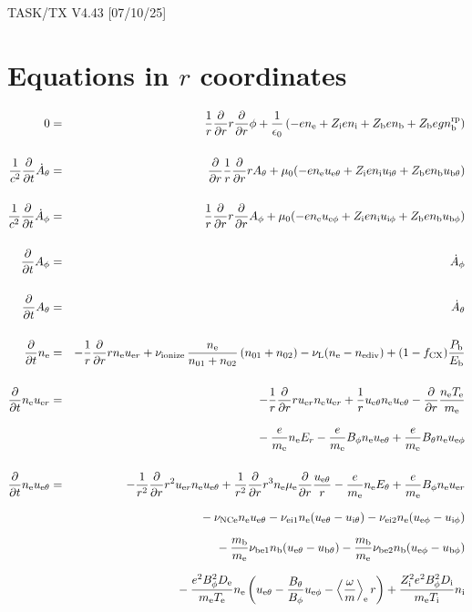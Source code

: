 \documentclass[11pt]{article}
\def\r#1{{\rm#1}}
\def\ddt{\frac{\partial}{\partial t}}
\def\ddr{\frac{\partial}{\partial r}}
\def\ave#1{\left\langle#1\right\rangle}
\def\me{m_\r{e}}
\def\mb{m_\r{b}}
\def\mue{\mu_\r{e}}
\def\De{D_\r{e}}
\def\Di{D_\r{i}}
\def\ne{n_\r{e}}
\def\ni{n_\r{i}}
\def\nb{n_\r{b}}
\def\uer{u_{\r{e}r}}
\def\ueth{u_{\r{e}\theta}}
\def\uith{u_{\r{i}\theta}}
\def\ubth{u_{\r{b}\theta}}
\def\ueph{u_{\r{e}\phi}}
\def\uiph{u_{\r{i}\phi}}
\def\ubph{u_{\r{b}\phi}}
\def\Er{E_r}
\def\Eth{E_\theta}
\def\Bth{B_\theta}
\def\Bph{B_\phi}
\def\Athd{\dot{A}_\theta}
\def\Aphd{\dot{A}_\phi}
\def\Ath{A_\theta}
\def\Aph{A_\phi}
\def\Te{T_\r{e}}
\def\Ti{T_\r{i}}
\def\nna{n_{01}}
\def\nnb{n_{02}}
\def\Zi{Z_\r{i}}
\def\Zb{Z_\r{b}}
\def\Pb{P_\r{b}}
\def\Eb{E_\r{b}}
\def\nbrp{n_\r{b}^\r{rp}}
\def\fCX{f_\r{CX}}
\def\nuNCe{\nu_\r{NCe}}
\def\nuL{\nu_\r{L}}
\def\nuion{\nu_\r{ionize}}
\def\nediv{n_\r{ediv}}
\begin{document}
\begin{center}
TASK/TX V4.43 [07/10/25]
\end{center}

\section{Equations in $r$ coordinates}
\vspace{-5mm}

\begin{eqnarray}
%
%
  0 &=&
%
    \frac{1}{r} \ddr r \ddr \phi
%
  + \frac{1}{\epsilon_0}
%
    \left(-e \ne + \Zi e \ni + \Zb e \nb + \Zb e g \nbrp \right)
\\[5mm]
%
%
  \frac{1}{c^2} \ddt \Athd &=&
%
    \ddr \frac{1}{r} \ddr r \Ath
%
  + \mu_0 (-e \ne \ueth + \Zi e \ni \uith + \Zb e \nb \ubth)
\\[5mm]
%
%
  \frac{1}{c^2} \ddt \Aphd &=&
%
  \frac{1}{r} \ddr r \ddr \Aph
%
  + \mu_0 (-e \ne \ueph + \Zi e \ni \uiph + \Zb e \nb \ubph)
%
\\[5mm]
%
%
  \ddt \Aph &=&
%
  \Aphd
\\[5mm]
%
%
  \ddt \Ath &=&
%
  \Athd
\\[5mm]
%
%
  \ddt\ne &=&
%
  - \frac{1}{r} \ddr r \ne \uer 
%
  + \nuion\, \frac{\ne}{\nna+\nnb}\, (\nna+\nnb)
%
  - \nuL (\ne - \nediv)
%
  + (1 - \fCX) \frac{\Pb}{\Eb}
\\[5mm]
%
%
  \ddt \ne \uer &=&
%
  - \frac{1}{r} \ddr r \uer \ne \uer
%
  + \frac{1}{r} \ueth \ne \ueth
%
  - \ddr \frac{\ne \Te}{\me}
\nonumber\\[3mm]&&{}
%
  - \frac{e}{\me} \ne \Er
%
  - \frac{e}{\me} \Bph \ne \ueth
%
  + \frac{e}{\me} \Bth \ne \ueph
\\[5mm]
%
%
  \ddt \ne \ueth &=&
%
  - \frac{1}{r^2} \ddr r^2 \uer \ne \ueth
%
  + \frac{1}{r^2} \ddr r^3 \ne \mue \ddr \frac{\ueth}{r}
%
  - \frac{e}{\me} \ne \Eth
%
  + \frac{e}{\me} \Bph \ne \uer
\nonumber\\[2.5mm]&&{}
%
  - \nuNCe \ne \ueth
%
  - \nu_\r{ei1} \ne (\ueth - \uith)
%
  - \nu_\r{ei2} \ne (\ueph - \uiph)
\nonumber\\[2.5mm]&&{}
%
  - \frac{\mb}{\me} \nu_\r{be1} \nb (\ueth - \ubth)
%
  - \frac{\mb}{\me} \nu_\r{be2} \nb (\ueph - \ubph)
\nonumber\\[2.5mm]&&{}
%
  - \frac{e^2 \Bph^2 \De}{\me\Te}\ne
    \left(\ueth - \frac{\Bth}{\Bph}\ueph - \ave{\frac{\omega}{m}}_\r{e}
     r \right)
%
   + \frac{\Zi^2 e^2 \Bph^2 \Di}{\me\Ti}\ni

\end{eqnarray}
\end{document}
